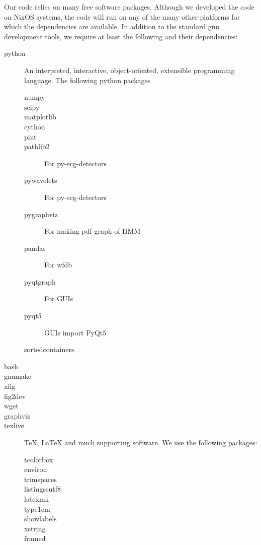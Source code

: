 Our code relies on many free software packages.  Although we developed
the code on NixOS systems, the code will run on any of the many other
platforms for which the dependencies are available.  In addition to
the standard gnu development tools, we require at least the following
and their dependencies:
  \begin{description}
  \item[python] An interpreted, interactive, object-oriented,
    extensible programming language.  The following python packages
    \begin{description}
    \item[numpy] 
    \item[scipy] 
    \item[matplotlib]
    \item[cython] 
    \item[pint] 
    \item[pathlib2] For py-ecg-detectors
    \item[pywavelets] For py-ecg-detectors
    \item[pygraphviz] For making pdf graph of HMM
    \item[pandas] For wfdb
    \item[pyqtgraph] For GUIs
    \item[pyqt5] GUIs import PyQt5 
    \item[sortedcontainers] 
    \end{description}
  \item[bash] 
  \item[gnumake] 
  \item[xfig]
  \item[fig2dev] 
  \item[wget]
  \item[graphviz] 
  \item[texlive] TeX, LaTeX and much supporting software.  We use the
    following packages:
    \begin{description}
    \item[tcolorbox] 
    \item[environ] 
    \item[trimspaces] 
    \item[listingssutf8] 
    \item[latexmk]
    \item[type1cm] 
    \item[showlabels] 
    \item[xstring] 
    \item[framed] 
    \end{description}
  \end{description}

